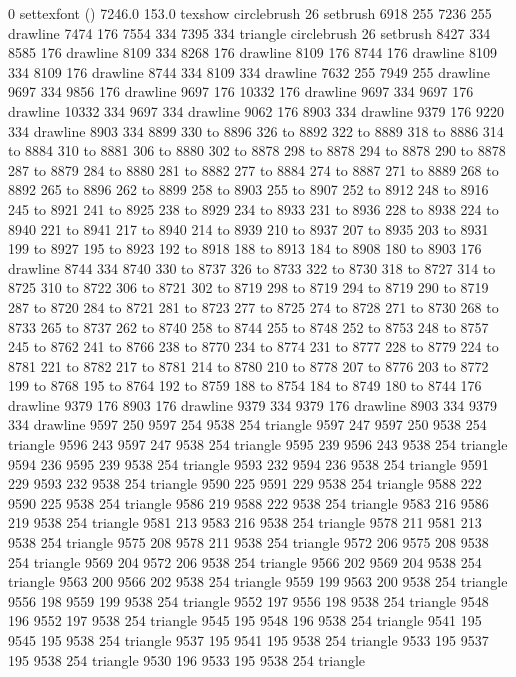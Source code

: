 0 settexfont
() 7246.0 153.0 texshow
circlebrush 26 setbrush
6918 255 7236 255 drawline
7474 176 7554 334 7395 334 triangle
circlebrush 26 setbrush
8427 334 8585 176 drawline
8109 334 8268 176 drawline
8109 176 8744 176 drawline
8109 334 8109 176 drawline
8744 334 8109 334 drawline
7632 255 7949 255 drawline
9697 334 9856 176 drawline
9697 176 10332 176 drawline
9697 334 9697 176 drawline
10332 334 9697 334 drawline
9062 176 8903 334 drawline
9379 176 9220 334 drawline
8903 334 8899 330 to 8896 326 to 8892 322 to 8889 318 to 8886 314 to 8884 310 to 8881 306 to 8880 302 to 8878 298 to 8878 294 to 8878 290 to 8878 287 to 8879 284 to 8880 281 to 8882 277 to 8884 274 to 8887 271 to 8889 268 to 8892 265 to 8896 262 to 8899 258 to 8903 255 to 8907 252 to 8912 248 to 8916 245 to 8921 241 to 8925 238 to 8929 234 to 8933 231 to 8936 228 to 8938 224 to 8940 221 to 8941 217 to 8940 214 to 8939 210 to 8937 207 to 8935 203 to 8931 199 to 8927 195 to 8923 192 to 8918 188 to 8913 184 to 8908 180 to 8903 176 drawline
8744 334 8740 330 to 8737 326 to 8733 322 to 8730 318 to 8727 314 to 8725 310 to 8722 306 to 8721 302 to 8719 298 to 8719 294 to 8719 290 to 8719 287 to 8720 284 to 8721 281 to 8723 277 to 8725 274 to 8728 271 to 8730 268 to 8733 265 to 8737 262 to 8740 258 to 8744 255 to 8748 252 to 8753 248 to 8757 245 to 8762 241 to 8766 238 to 8770 234 to 8774 231 to 8777 228 to 8779 224 to 8781 221 to 8782 217 to 8781 214 to 8780 210 to 8778 207 to 8776 203 to 8772 199 to 8768 195 to 8764 192 to 8759 188 to 8754 184 to 8749 180 to 8744 176 drawline
9379 176 8903 176 drawline
9379 334 9379 176 drawline
8903 334 9379 334 drawline
9597 250 9597 254 9538 254 triangle
9597 247 9597 250 9538 254 triangle
9596 243 9597 247 9538 254 triangle
9595 239 9596 243 9538 254 triangle
9594 236 9595 239 9538 254 triangle
9593 232 9594 236 9538 254 triangle
9591 229 9593 232 9538 254 triangle
9590 225 9591 229 9538 254 triangle
9588 222 9590 225 9538 254 triangle
9586 219 9588 222 9538 254 triangle
9583 216 9586 219 9538 254 triangle
9581 213 9583 216 9538 254 triangle
9578 211 9581 213 9538 254 triangle
9575 208 9578 211 9538 254 triangle
9572 206 9575 208 9538 254 triangle
9569 204 9572 206 9538 254 triangle
9566 202 9569 204 9538 254 triangle
9563 200 9566 202 9538 254 triangle
9559 199 9563 200 9538 254 triangle
9556 198 9559 199 9538 254 triangle
9552 197 9556 198 9538 254 triangle
9548 196 9552 197 9538 254 triangle
9545 195 9548 196 9538 254 triangle
9541 195 9545 195 9538 254 triangle
9537 195 9541 195 9538 254 triangle
9533 195 9537 195 9538 254 triangle
9530 196 9533 195 9538 254 triangle
